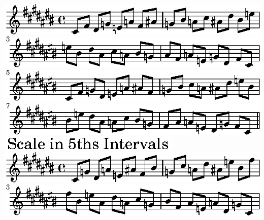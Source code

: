 \ifx\betweenLilyPondSystem \undefined
  \linebreak
\else
  \expandafter{}%
\fi
\includegraphics{88/lily-44fe9253-15}%
\ifx\betweenLilyPondSystem \undefined
  \linebreak
\else
  \expandafter{}%
\fi
\includegraphics{88/lily-44fe9253-16}%
\ifx\betweenLilyPondSystem \undefined
  \linebreak
\else
  \expandafter{}%
\fi
\includegraphics{88/lily-44fe9253-17}%
\ifx\betweenLilyPondSystem \undefined
  \linebreak
\else
  \expandafter{}%
\fi
\includegraphics{88/lily-44fe9253-18}%
\ifx\betweenLilyPondSystem \undefined
  \linebreak
\else
  \expandafter{}%
\fi
\includegraphics{88/lily-44fe9253-19}%
\ifx\betweenLilyPondSystem \undefined
  \linebreak
\else
  \expandafter{}%
\fi
\includegraphics{88/lily-44fe9253-20}%
\ifx\betweenLilyPondSystem \undefined
  \linebreak
\else
  \expandafter{}%
\fi
\includegraphics{88/lily-44fe9253-21}%
